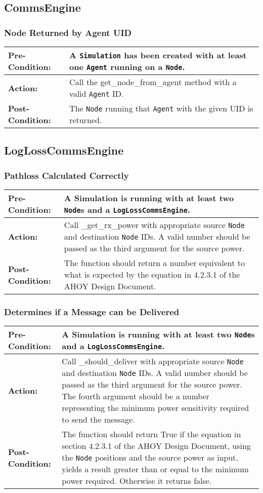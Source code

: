\documentclass[titlepage]{article}
\newcommand{\testcase}[3]{
    \begin{center}
    \begin{tabular}{| l | p{0.7\textwidth}|}
        \hline
        \rowcolor[gray]{0.8}\textbf{Pre-Condition:} & #1 \\ \hline
        \textbf{Action:} & #2 \\ \hline
        \rowcolor[gray]{0.8}\textbf{Post-Condition:} & #3 \\ \hline
    \end{tabular}
    \end{center}
}
\begin{document}
\subsection{CommsEngine}
\subsubsection{Node Returned by Agent UID}
\testcase{A \texttt{Simulation} has been created with at least one \texttt{Agent} running on a \texttt{Node}. }{Call the
get\_node\_from\_agent method with a valid \texttt{Agent} ID.}{The \texttt{Node} running that \texttt{Agent} with the
given UID is returned.}


\subsection{LogLossCommsEngine}
\subsubsection{Pathloss Calculated Correctly}
\testcase{A Simulation is running with at least two \texttt{Node}s and a \texttt{LogLossCommsEngine}. }{Call \_get\_rx\_power with appropriate source \texttt{Node} and destination \texttt{Node} IDs. A valid number should be passed as the third argument for the source power. }{The function should return a number equivalent to what is expected by the equation in 4.2.3.1 of the AHOY Design Document.}

\subsubsection{Determines if a Message can be Delivered}
\testcase{A Simulation is running with at least two \texttt{Node}s and a \texttt{LogLossCommsEngine}. }{Call
\_should\_deliver with appropriate source \texttt{Node} and destination \texttt{Node} IDs. A valid number should be
passed as the third argument for the source power.  The fourth argument should be a number representing the minimum
power sensitivity required to send the message. }{The function should return True if the equation in section 4.2.3.1 of
the AHOY Design Document, using the \texttt{Node} positions and the source power as input, yields a result greater than
or equal to the minimum power required. Otherwise it returns false.}
\end{document}
